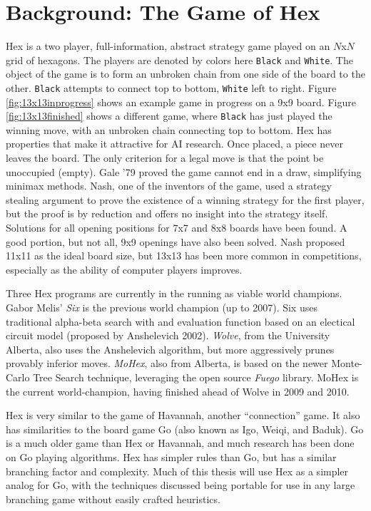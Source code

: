 \documentclass[10pt,a4paper]{report}
\newcommand{\black}{\texttt{Black}}
\newcommand{\white}{\texttt{White}}
\begin{document}
\section{Background: The Game of Hex}
Hex is a two player, full-information, abstract strategy game played on an $N$x$N$ grid of hexagons. The players are denoted by colors here \black{} and \white. The object of the game is to form an unbroken chain from one side of the board to the other. \black{} attempts to connect top to bottom, \white{} left to right. Figure \ref{fig:13x13inprogress} shows an example game in progress on a 9x9 board. Figure \ref{fig:13x13finished} shows a different game, where \black{} has just played the winning move, with an unbroken chain connecting top to bottom. Hex has properties that make it attractive for AI research. Once placed, a piece never leaves the board. The only criterion for a legal move is that the point be unoccupied (empty). Gale '79 proved the game cannot end in a draw, simplifying minimax methods. Nash, one of the inventors of the game, used a strategy stealing argument to prove the existence of a winning strategy for the first player, but the proof is by reduction and offers no insight into the strategy itself. Solutions for all opening positions for 7x7 and 8x8 boards have been found\cite{henderson2009solving}. A good portion, but not all, 9x9 openings have also been solved. Nash proposed 11x11 as the ideal board size, but 13x13 has been more common in competitions, especially as the ability of computer players improves.

Three Hex programs are currently in the running as viable world champions. Gabor Melis' \emph{Six} is the previous world champion (up to 2007). Six uses traditional alpha-beta search with and evaluation function based on an electical circuit model (proposed by Anshelevich 2002)\cite{anshelevich2002hierarchical}. \emph{Wolve}, from the University Alberta, also uses the Anshelevich algorithm, but more aggressively prunes provably inferior moves. \emph{MoHex}, also from Alberta, is based on the newer Monte-Carlo Tree Search technique, leveraging the open source \emph{Fuego} library. MoHex is the current world-champion, having finished ahead of Wolve in 2009 and 2010.

Hex is very similar to the game of Havannah, another ``connection'' game. It also has similarities to the board game Go (also known as Igo, Weiqi, and Baduk). Go is a much older game than Hex or Havannah, and much research has been done on Go playing algorithms. Hex has simpler rules than Go, but has a similar branching factor and complexity. Much of this thesis will use Hex as a simpler analog for Go, with the techniques discussed being portable for use in any large branching game without easily crafted heuristics.
\end{document}
